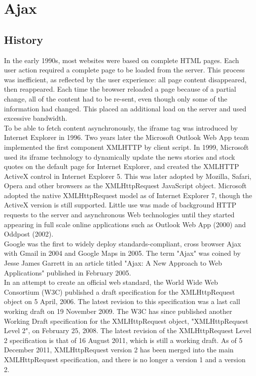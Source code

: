 \section{Ajax}
	
\subsection{History}
In the early 1990s, most websites were based on complete HTML pages. Each user action required a complete page to be loaded from the server. This process was inefficient, as reflected by the user experience: all page content disappeared, then reappeared. Each time the browser reloaded a page because of a partial change, all of the content had to be re-sent, even though only some of the information had changed. This placed an additional load on the server and used excessive bandwidth.\\
	
To be able to fetch content asynchronously, the iframe tag was introduced by Internet Explorer in 1996. Two years later the Microsoft Outlook Web App team implemented the first component XMLHTTP by client script.
In 1999, Microsoft used its iframe technology to dynamically update the news stories and stock quotes on the default page for Internet Explorer, and created the XMLHTTP ActiveX control in Internet Explorer 5. This was later adopted by Mozilla, Safari, Opera and other browsers as the XMLHttpRequest JavaScript object. Microsoft adopted the native XMLHttpRequest model as of Internet Explorer 7, though the ActiveX version is still supported. Little use was made of background HTTP requests to the server and asynchronous Web technologies until they started appearing in full scale online applications such as Outlook Web App (2000) and Oddpost (2002).\\
	
Google was the first to widely deploy standards-compliant, cross browser Ajax with Gmail in 2004 and Google Maps in 2005. The term "Ajax" was coined by Jesse James Garrett in an article titled "Ajax: A New Approach to Web Applications" published in February 2005.\\
	
In an attempt to create an official web standard, the World Wide Web Consortium (W3C) published a draft specification for the XMLHttpRequest object on 5 April, 2006. The latest revision to this specification was a last call working draft on 19 November 2009. The W3C has since published another Working Draft specification for the XMLHttpRequest object, "XMLHttpRequest Level 2", on February 25, 2008. The latest revision of the XMLHttpRequest Level 2 specification is that of 16 August 2011, which is still a working draft. As of 5 December 2011, XMLHttpRequest version 2 has been merged into the main XMLHttpRequest specification, and there is no longer a version 1 and a version 2.
		

